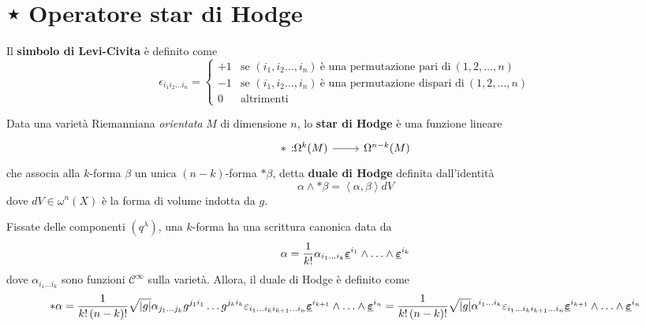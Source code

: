\section{⋆ Operatore star di Hodge}
\begin{define}
	Il \textbf{simbolo di Levi-Civita} è definito come
	\begin{equation}
		\epsilon_{i_1i_2\ldots i_n}=\begin{cases}
			+1&\text{se }\left(i_1,i_2\ldots,i_n\right)\ \text{è una permutazione pari di}\ (1,2,\ldots, n)\\
			-1&\text{se }\left(i_1,i_2\ldots,i_n\right)\ \text{è una permutazione dispari di}\ (1,2,\ldots, n)\\
			0&\text{altrimenti}
		\end{cases}
	\end{equation}
\end{define}
\begin{define}%
	Data una varietà Riemanniana \textit{orientata} $M$ di dimensione $n$, lo \textbf{star di Hodge} è una funzione lineare
	\begin{equation*}
		\funz[\ast]{\Omega^k(M)}{\Omega^{n-k}(M)}
	\end{equation*}
	che associa alla $k$-forma $\beta$ un unica $(n-k)$-forma $\ast\beta$, detta \textbf{duale di Hodge} definita dall'identità
	\begin{equation}%
		\alpha\wedge\ast\beta=\left<\alpha,\beta\right>dV
	\end{equation}
	dove $dV\in\omega^n(X)$ è la forma di volume indotta da $g$.
\end{define}
Fissate delle componenti $\left(q^\lambda\right)$, una $k$-forma ha una scrittura canonica data da
\begin{equation}
	\alpha=\frac{1}{k!}\alpha_{i_1\ldots i_k}\vb*{\underline{\varepsilon}}^{i_1}\wedge\ldots\wedge\vb*{\underline{\varepsilon}}^{i_k}
\end{equation}
dove $\alpha_{i_1\ldots i_k}$ sono funzioni $\mathcal{C}^{\infty}$ sulla varietà. Allora, il duale di Hodge è definito come
\begin{equation*}
\ast\alpha=\frac{1}{k!\left(n-k\right)!}\sqrt{\abs{g}}\alpha_{j_1\ldots j_k}g^{j_1i_1}\ldots g^{j_ki_k}\varepsilon_{i_1\ldots i_ki_{k+1}\ldots i_n}\vb*{\underline{\varepsilon}}^{i_{k+1}}\wedge\ldots\wedge\vb*{\underline{\varepsilon}}^{i_n}=\frac{1}{k!\left(n-k\right)!}\sqrt{\abs{g}}\alpha^{i_1\ldots i_k}\varepsilon_{i_1\ldots i_ki_{k+1}\ldots i_n}\vb*{\underline{\varepsilon}}^{i_{k+1}}\wedge\ldots\wedge\vb*{\underline{\varepsilon}}^{i_n}
\end{equation*}
